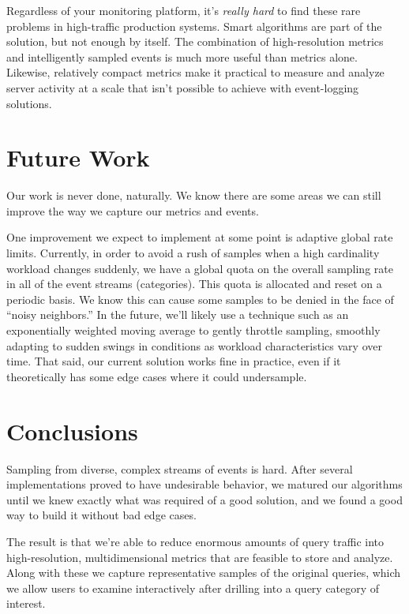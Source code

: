 \documentclass{vivid_layout}
\begin{document}
Regardless of your monitoring platform, it's \emph{really hard} to find these
rare problems in high-traffic production systems. Smart algorithms are part of
the solution, but not enough by itself. The combination of high-resolution
metrics and intelligently sampled events is much more useful than metrics alone.
Likewise, relatively compact metrics make it practical to measure and analyze
server activity at a scale that isn't possible to achieve with event-logging
solutions.

\section{Future Work}

Our work is never done, naturally. We know there are some areas we can still
improve the way we capture our metrics and events.

One improvement we expect to implement at some point is adaptive global rate
limits. Currently, in order to avoid a rush of samples when a high cardinality
workload changes suddenly, we have a global quota on the overall sampling rate
in all of the event streams (categories). This quota is allocated and reset on a
periodic basis. We know this can cause some samples to be denied in the face of
``noisy neighbors.'' In the future, we'll likely use a technique such as an
exponentially weighted moving average to gently throttle sampling, smoothly
adapting to sudden swings in conditions as workload characteristics vary over
time. That said, our current solution works fine in practice, even if it
theoretically has some edge cases where it could undersample.

\section{Conclusions}

Sampling from diverse, complex streams of events is hard. After several
implementations proved to have undesirable behavior, we matured our algorithms 
until we knew exactly what was required of a good solution, and we found a good
way to build it without bad edge cases.

The result is that we're able to reduce enormous amounts of query traffic into
high-resolution, multidimensional metrics that are feasible to store and
analyze. Along with these we capture representative samples of the original
queries, which we allow users to examine interactively after drilling into a
query category of interest.
\end{document}

